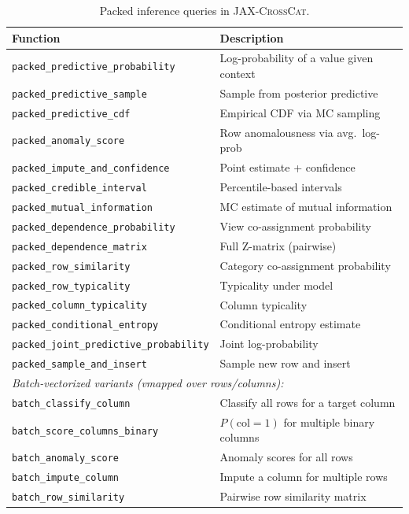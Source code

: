 \documentclass[11pt]{article}
\newcommand{\jaxcc}{\textsc{JAX-CrossCat}}
\begin{document}
\begin{table}[!htb]
\centering
\small
\caption{Packed inference queries in \jaxcc{}.}
\label{tab:queries}
\begin{tabular}{lp{7cm}}
\toprule
Function & Description \\
\midrule
\texttt{packed\_predictive\_probability} & Log-probability of a value given context \\
\texttt{packed\_predictive\_sample} & Sample from posterior predictive \\
\texttt{packed\_predictive\_cdf} & Empirical CDF via MC sampling \\
\texttt{packed\_anomaly\_score} & Row anomalousness via avg.\ log-prob \\
\texttt{packed\_impute\_and\_confidence} & Point estimate + confidence \\
\texttt{packed\_credible\_interval} & Percentile-based intervals \\
\texttt{packed\_mutual\_information} & MC estimate of mutual information \\
\texttt{packed\_dependence\_probability} & View co-assignment probability \\
\texttt{packed\_dependence\_matrix} & Full Z-matrix (pairwise) \\
\texttt{packed\_row\_similarity} & Category co-assignment probability \\
\texttt{packed\_row\_typicality} & Typicality under model \\
\texttt{packed\_column\_typicality} & Column typicality \\
\texttt{packed\_conditional\_entropy} & Conditional entropy estimate \\
\texttt{packed\_joint\_predictive\_probability} & Joint log-probability \\
\texttt{packed\_sample\_and\_insert} & Sample new row and insert \\
\midrule
\multicolumn{2}{l}{\textit{Batch-vectorized variants (vmapped over rows/columns):}} \\
\texttt{batch\_classify\_column} & Classify all rows for a target column \\
\texttt{batch\_score\_columns\_binary} & $P(\text{col}=1)$ for multiple binary columns \\
\texttt{batch\_anomaly\_score} & Anomaly scores for all rows \\
\texttt{batch\_impute\_column} & Impute a column for multiple rows \\
\texttt{batch\_row\_similarity} & Pairwise row similarity matrix \\

\end{tabular}
\end{table}
\end{document}

